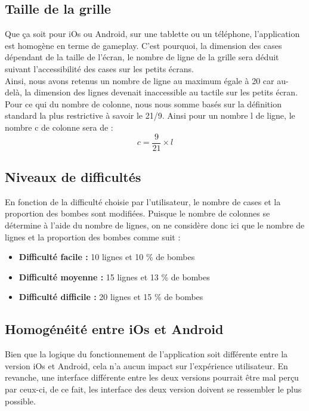 \documentclass{article}
\begin{document}
\subsection{Taille de la grille}

Que ça soit pour iOs ou Android, sur une tablette ou un téléphone, l'application est homogène en terme de gameplay. C'est pourquoi, la dimension des cases dépendant de la taille de l'écran, le nombre de ligne de la grille sera déduit suivant l'accessibilité des cases sur les petits écrans. \\

Ainsi, nous avons retenus un nombre de ligne au maximum égale à 20 car au-delà, la dimension des lignes devenait inaccessible au tactile sur les petits écran. 
Pour ce qui du nombre de colonne, nous nous somme basés sur la définition standard la plus restrictive à savoir le 21/9. Ainsi pour un nombre l de ligne, le nombre c de colonne sera de :
$$c = \frac{9}{21} \times l$$

\subsection{Niveaux de difficultés}
En fonction de la difficulté choisie par l'utilisateur, le nombre de cases et la proportion des bombes sont modifiées. Puisque le nombre de colonnes se détermine à l'aide du nombre de lignes, on ne considère donc ici que le nombre de lignes et la proportion des bombes comme suit :\\

\begin{itemize}
    \item \textbf{Difficulté facile :} 10 lignes et 10 \% de bombes
    \item \textbf{Difficulté moyenne :} 15 lignes et 13 \% de bombes
    \item \textbf{Difficulté difficile :} 20 lignes et 15 \% de bombes
\end{itemize}


\subsection{Homogénéité entre iOs et Android}
Bien que la logique du fonctionnement de l'application soit différente entre la version iOs et Android, cela n'a aucun impact sur l'expérience utilisateur. En revanche, une interface différente entre les deux versions pourrait être mal perçu par ceux-ci, de ce fait, les interface des deux version doivent se ressembler le plus possible.\\
\end{document}
